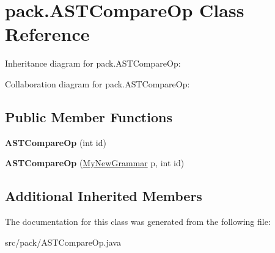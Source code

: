 \hypertarget{classpack_1_1_a_s_t_compare_op}{}\section{pack.\+A\+S\+T\+Compare\+Op Class Reference}
\label{classpack_1_1_a_s_t_compare_op}


Inheritance diagram for pack.\+A\+S\+T\+Compare\+Op\+:


Collaboration diagram for pack.\+A\+S\+T\+Compare\+Op\+:
\subsection*{Public Member Functions}
\begin{DoxyCompactItemize}
\item 
{\bfseries A\+S\+T\+Compare\+Op} (int id)\hypertarget{classpack_1_1_a_s_t_compare_op_a8fd2212fffddb84865ef37351d2a7ec5}{}\label{classpack_1_1_a_s_t_compare_op_a8fd2212fffddb84865ef37351d2a7ec5}

\item 
{\bfseries A\+S\+T\+Compare\+Op} (\hyperlink{classpack_1_1_my_new_grammar}{My\+New\+Grammar} p, int id)\hypertarget{classpack_1_1_a_s_t_compare_op_a9aff6384ba20024ca92e583efe0844e8}{}\label{classpack_1_1_a_s_t_compare_op_a9aff6384ba20024ca92e583efe0844e8}

\end{DoxyCompactItemize}
\subsection*{Additional Inherited Members}


The documentation for this class was generated from the following file\+:\begin{DoxyCompactItemize}
\item 
src/pack/A\+S\+T\+Compare\+Op.\+java\end{DoxyCompactItemize}

